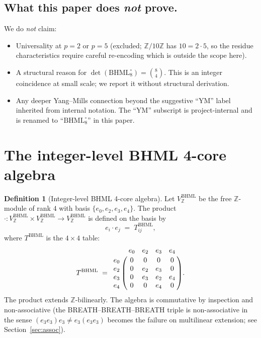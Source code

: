 \documentclass[11pt,reqno]{amsart}
\theoremstyle{plain}
\theoremstyle{definition}
\newtheorem{definition}[theorem]{Definition}
\theoremstyle{remark}
\newcommand{\Z}{\mathbb{Z}}
\newcommand{\BHML}{\mathrm{BHML}}
\begin{document}
\subsection{What this paper does \emph{not} prove.}
We do \emph{not} claim:
\begin{itemize}
\item Universality at $p = 2$ or $p = 5$ (excluded; $\Z/10\Z$ has
$10 = 2 \cdot 5$, so the residue characteristics require careful
re-encoding which is outside the scope here).
\item A structural reason for $\det(\BHML_{8}^{\circ}) =
\binom{8}{4}$. This is an integer coincidence at small scale; we
report it without structural derivation.
\item Any deeper Yang--Mills connection beyond the suggestive
``YM'' label inherited from internal notation. The ``YM'' subscript
is project-internal and is renamed to ``$\BHML_{8}^{\circ}$'' in
this paper.
\end{itemize}

\section{The integer-level BHML 4-core algebra}
\label{sec:def}

\begin{definition}[Integer-level BHML 4-core algebra]
\label{def:bhml-z}
Let $V^{\BHML}_{\Z}$ be the free $\Z$-module of rank $4$ with basis
$\{e_{0}, e_{2}, e_{3}, e_{4}\}$. The product
$\cdot : V^{\BHML}_{\Z} \times V^{\BHML}_{\Z} \to V^{\BHML}_{\Z}$ is
defined on the basis by
\[
e_{i} \cdot e_{j} \;=\; T^{\BHML}_{ij},
\]
where $T^{\BHML}$ is the $4 \times 4$ table:
\[
T^{\BHML} \;=\;
\bordermatrix{
       & e_{0} & e_{2} & e_{3} & e_{4} \cr
e_{0}  & 0     & 0     & 0     & 0 \cr
e_{2}  & 0     & e_{2} & e_{3} & 0 \cr
e_{3}  & 0     & e_{3} & e_{2} & e_{4} \cr
e_{4}  & 0     & 0     & e_{4} & 0
}.
\]
The product extends $\Z$-bilinearly. The algebra is commutative by
inspection and non-associative (the BREATH--BREATH--BREATH triple is
non-associative in the sense $(e_{3} e_{3}) e_{3} \neq e_{3}
(e_{3} e_{3})$ becomes the failure on multilinear extension; see
Section~\ref{sec:assoc}).
\end{definition}
\end{document}
